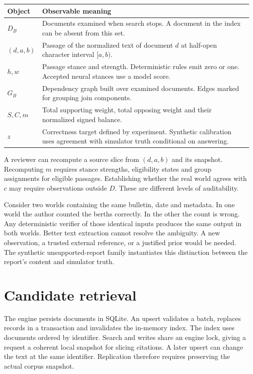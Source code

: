 \begin{center}\small
\begin{tabularx}{\linewidth}{@{}lX@{}}\toprule
Object & Observable meaning\\\midrule
$D_B$ & Documents examined when search stops. A document in the index can be absent from this set.\\
$(d,a,b)$ & Passage of the normalized text of document $d$ at half-open character interval $[a,b)$.\\
$h,w$ & Passage stance and strength. Deterministic rules emit zero or one. Accepted neural stances use a model score.\\
$G_B$ & Dependency graph built over examined documents. Edges marked for grouping join components.\\
$S,C,m$ & Total supporting weight, total opposing weight and their normalized signed balance.\\
$z$ & Correctness target defined by experiment. Synthetic calibration uses agreement with simulator truth conditional on answering.\\\bottomrule
\end{tabularx}
\end{center}
A reviewer can recompute a source slice from $(d,a,b)$ and its snapshot. Recomputing $m$ requires stance strengths, eligibility states and group assignments for eligible passages. Establishing whether the real world agrees with $c$ may require observations outside $D$. These are different levels of auditability.

Consider two worlds containing the same bulletin, date and metadata. In one world the author counted the berths correctly. In the other the count is wrong. Any deterministic verifier of those identical inputs produces the same output in both worlds. Better text extraction cannot resolve the ambiguity. A new observation, a trusted external reference, or a justified prior would be needed. The synthetic unsupported-report family instantiates this distinction between the report's content and simulator truth.

\section{Candidate retrieval}
The engine persists documents in SQLite. An upsert validates a batch, replaces records in a transaction and invalidates the in-memory index. The index uses documents ordered by identifier. Search and writes share an engine lock, giving a request a coherent local snapshot for slicing citations. A later upsert can change the text at the same identifier. Replication therefore requires preserving the actual corpus snapshot.

